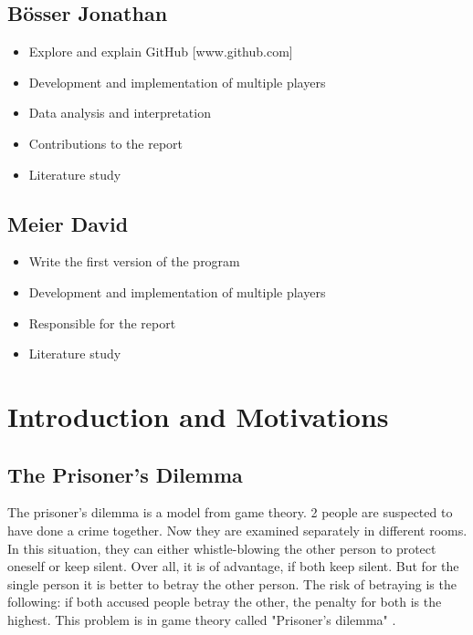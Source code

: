 \documentclass[11pt,twoside]{article}
\begin{document}
\subsection{B\"osser Jonathan}
\begin{itemize}
\item Explore and explain GitHub [www.github.com]
\item Development and implementation of multiple players 
\item Data analysis and interpretation
\item Contributions to the report
\item Literature study
\end{itemize}

\subsection{Meier David}
\begin{itemize}
\item Write the first version of the program
\item Development and implementation of multiple players
\item Responsible for the report
\item Literature study
\end{itemize}

\section{Introduction and Motivations}
\subsection{The Prisoner's Dilemma}
The prisoner's dilemma is a model from game theory. 2 people are suspected to have done a crime together. Now they are examined separately in different rooms. In this situation, they can either whistle-blowing the other person to protect oneself or keep silent. Over all, it is of advantage, if both keep silent. But for the single person it is better to betray the other person. The risk of betraying is the following: if both accused people betray the other, the penalty for both is the highest. This problem is in game theory called "Prisoner's dilemma" \cite{stanford}.
\end{document}
